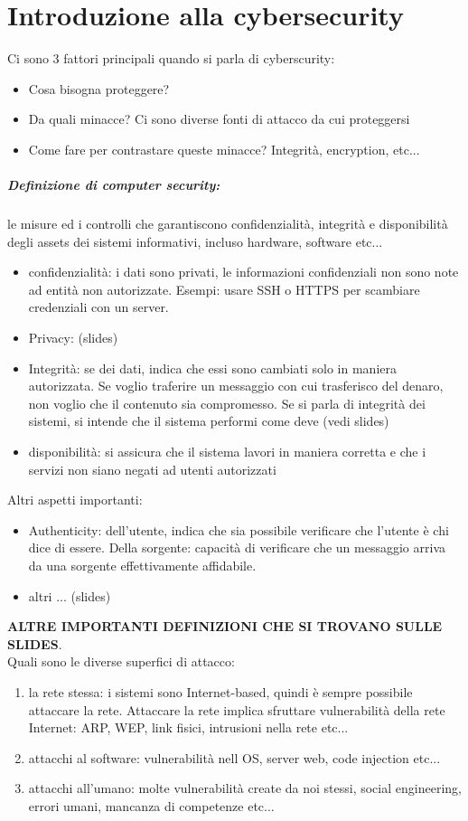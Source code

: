 \documentclass[12pt, oneside]{extbook} %
\begin{document}
\chapter{Introduzione alla cybersecurity}
Ci sono 3 fattori principali quando si parla di cyberscurity:
\begin{itemize}
\item Cosa bisogna proteggere?
\item Da quali minacce? Ci sono diverse fonti di attacco da cui proteggersi
\item Come fare per contrastare queste minacce? Integrità, encryption, etc...
\end{itemize}
\paragraph{Definizione di computer security:}le misure ed i controlli che garantiscono confidenzialità, integrità e disponibilità degli assets dei sistemi informativi, incluso hardware, software etc...
\begin{itemize}
\item confidenzialità: i dati sono privati, le informazioni confidenziali non sono note ad entità non autorizzate. Esempi: usare SSH o HTTPS per scambiare credenziali con un server.
\item Privacy: (slides)
\item Integrità: se dei dati, indica che essi sono cambiati solo in maniera autorizzata. Se voglio traferire un messaggio con cui trasferisco del denaro, non voglio che il contenuto sia compromesso. Se si parla di integrità dei sistemi, si intende che il sistema performi come deve (vedi slides)
\item disponibilità: si assicura che il sistema lavori in maniera corretta e che i servizi non siano negati ad utenti autorizzati
\end{itemize}
Altri aspetti importanti:
\begin{itemize}
\item Authenticity: dell'utente, indica che sia possibile verificare che l'utente è chi dice di essere. Della sorgente: capacità di verificare che un messaggio arriva da una sorgente effettivamente affidabile.
\item altri ... (slides)
\end{itemize} 
\textbf{ALTRE IMPORTANTI DEFINIZIONI CHE SI TROVANO SULLE SLIDES}. \\ Quali sono le diverse superfici di attacco:
\begin{enumerate}
\item la rete stessa: i sistemi sono Internet-based, quindi è sempre possibile attaccare la rete. Attaccare la rete implica sfruttare vulnerabilità della rete Internet: ARP, WEP, link fisici, intrusioni nella rete etc...
\item attacchi al software: vulnerabilità nell OS, server web, code injection etc...
\item attacchi all'umano: molte vulnerabilità create da noi stessi, social engineering, errori umani, mancanza di competenze etc...
\end{enumerate}
\end{document}
